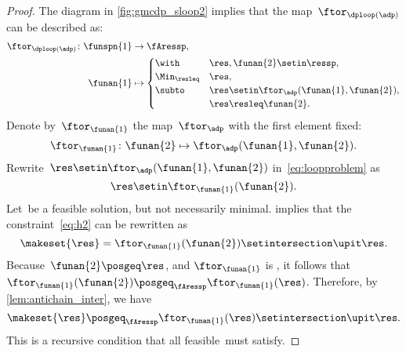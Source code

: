 \begin{proof}
    The diagram in \cref{fig:gmcdp_sloop2} implies that the map~$\ftor_{\dploop(\adp)}$ can be described as:
    \begin{align}
        \ftor_{\dploop(\adp)}\colon\funspn{1} & \to\fAressp,\label{eq:loopproblem} \\
        \funan{1}                             & \mapsto\begin{cases}
                                                           \with          & \res,\funan{2}\setin\ressp,                  \\
                                                           \Min_{\resleq} & \res,                                        \\
                                                           \subto         & \res\setin\ftor_{\adp}(\funan{1},\funan{2}), \\
                                                                          & \res\resleq\funan{2}.
                                                       \end{cases}
    \end{align}
    Denote by~$\ftor_{\funan{1}}$ the map~$\ftor_{\adp}$ with the first element fixed:
    \begin{equation}
        \ftor_{\funan{1}}\colon\funan{2}\mapsto\ftor_{\adp}(\funan{1},\funan{2}).
    \end{equation}
    Rewrite~$\res\setin\ftor_{\adp}(\funan{1},\funan{2})$ in~\cref{eq:loopproblem} as
    \begin{equation}
        \res\setin\ftor_{\funan{1}}(\funan{2}).
        \label{eq:h2}
    \end{equation}
    Let~\res be a feasible solution, but not necessarily minimal.
     implies that the constraint~\cref{eq:h2} can be rewritten as
    \begin{equation}
        \makeset{\res}=\ftor_{\funan{1}}(\funan{2})\setintersection\upit\res.
        \label{eq:h3}
    \end{equation}
    Because~$\funan{2}\posgeq\res$, and $\ftor_{\funan{1}}$ is \scottcontinuous, it follows that~$\ftor_{\funan{1}}(\funan{2})\posgeq_{\fAressp}\ftor_{\funan{1}}(\res)$.
    Therefore, by \cref{lem:antichain_inter}, we have
    \begin{equation}
        \makeset{\res}\posgeq_{\fAressp}\ftor_{\funan{1}}(\res)\setintersection\upit\res.
        \label{eq:fea}
    \end{equation}
    This is a recursive condition that all feasible~\res must satisfy.


\end{proof}

